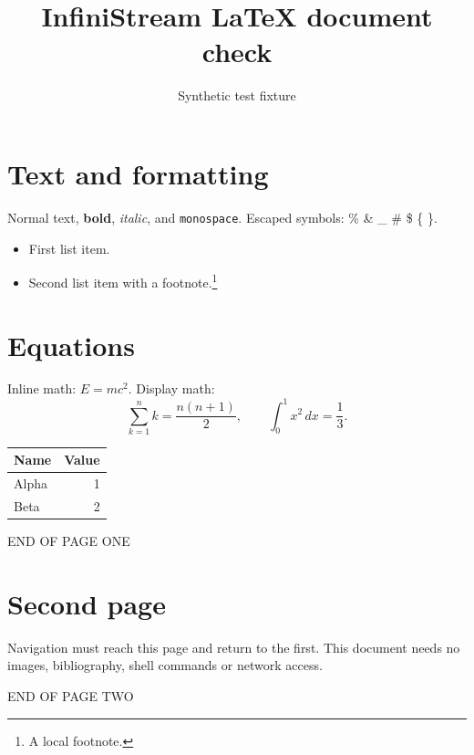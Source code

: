 \documentclass[12pt]{article}
\title{InfiniStream LaTeX document check}
\author{Synthetic test fixture}
\date{}
\begin{document}
\maketitle
\section{Text and formatting}
Normal text, \textbf{bold}, \textit{italic}, and \texttt{monospace}.
Escaped symbols: \% \& \_ \# \$ \{ \}.
\begin{itemize}
\item First list item.
\item Second list item with a footnote.\footnote{A local footnote.}
\end{itemize}
\section{Equations}
Inline math: $E=mc^2$. Display math:
\[
\sum_{k=1}^{n} k = \frac{n(n+1)}{2}, \qquad
\int_0^1 x^2\,dx = \frac{1}{3}.
\]
\begin{tabular}{|l|r|}\hline
Name & Value \\ \hline
Alpha & 1 \\ Beta & 2 \\ \hline
\end{tabular}
\par END OF PAGE ONE
\newpage
\section{Second page}
Navigation must reach this page and return to the first.
This document needs no images, bibliography, shell commands or network access.
\par END OF PAGE TWO
\end{document}
